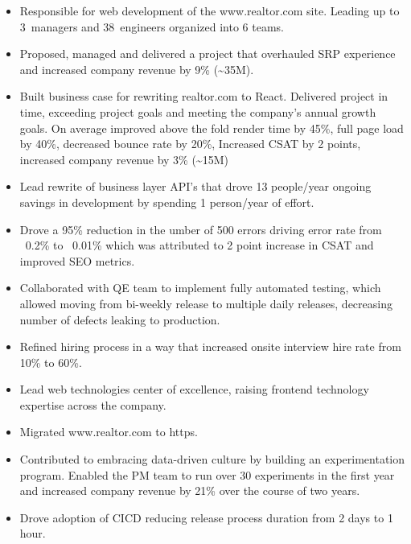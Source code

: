 \documentclass[11pt,a4paper,roman]{moderncv}       %
\begin{document}
{\begin{itemize}
    \item Responsible for web development of the www.realtor.com site. Leading up to 3~managers and 38~engineers organized into 6 teams.  
    \item Proposed, managed and delivered a project that overhauled SRP experience and increased company revenue by 9\% (\textasciitilde35M).
    \item Built business case for rewriting realtor.com to React. Delivered project in time, exceeding project goals and meeting the company's annual growth goals. On average improved above the fold render time by 45\%, full page load by 40\%, decreased bounce rate by 20\%, Increased CSAT by 2 points, increased company revenue by 3\% (\textasciitilde15M)
    \item Lead rewrite of business layer API's that drove 13 people/year ongoing savings in development by spending 1 person/year of effort.
    \item Drove a 95\% reduction in the umber of 500 errors driving error rate from ~0.2\% to ~0.01\% which was attributed to 2 point increase in CSAT and improved SEO metrics.
    \item Collaborated with QE team to implement fully automated testing, which allowed moving from bi-weekly release to multiple daily releases, decreasing number of defects leaking to production.
    \item Refined hiring process in a way that increased onsite interview hire rate from 10\% to 60\%.
    \item Lead web technologies center of excellence, raising frontend technology expertise across the company.
    \item Migrated www.realtor.com to https.
    \item Contributed to embracing data-driven culture by building an experimentation program. Enabled the PM team to run over 30 experiments in the first year and increased company revenue by 21\% over the course of two years.
    \item Drove adoption of CICD reducing release process duration from 2 days to 1 hour.

\end{itemize}

\bigskip


}
\end{document}
